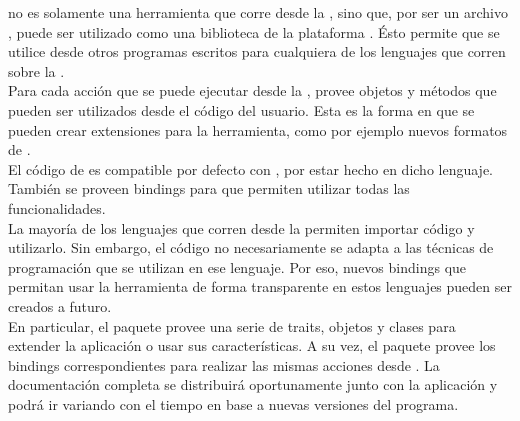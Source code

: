 \fronttier no es solamente una herramienta que corre desde la \cli, sino que, 
por ser un archivo \jar, puede ser utilizado como una biblioteca de la  
plataforma \java. Ésto permite que se utilice desde otros programas escritos 
para cualquiera de los lenguajes que corren sobre la \jvm.\\
Para cada acción que se puede ejecutar desde la \cli, \fronttier provee objetos 
y métodos que pueden ser utilizados desde el código del usuario. Esta es la 
forma en que se pueden crear extensiones para la herramienta, como por ejemplo 
nuevos formatos de \conffiles.\\
El código de \fronttier es compatible por defecto con \scala, por estar hecho 
en dicho lenguaje. También se proveen bindings para \java que permiten utilizar 
todas las funcionalidades.\\
La mayoría de los lenguajes que corren desde la \jvm permiten importar código 
\java y utilizarlo. Sin embargo, el código \java no necesariamente se adapta a 
las técnicas de programación que se utilizan en ese lenguaje. Por eso, nuevos 
bindings que permitan usar la herramienta de forma transparente en estos 
lenguajes pueden ser creados a futuro.\\
En particular, el paquete  provee una serie de 
traits, objetos y clases para extender la aplicación o usar sus 
características. A su vez, el paquete  
provee los bindings correspondientes para realizar las mismas acciones desde 
\java. La documentación completa se distribuirá oportunamente junto con la 
aplicación y podrá ir variando con el tiempo en base a nuevas versiones del 
programa.